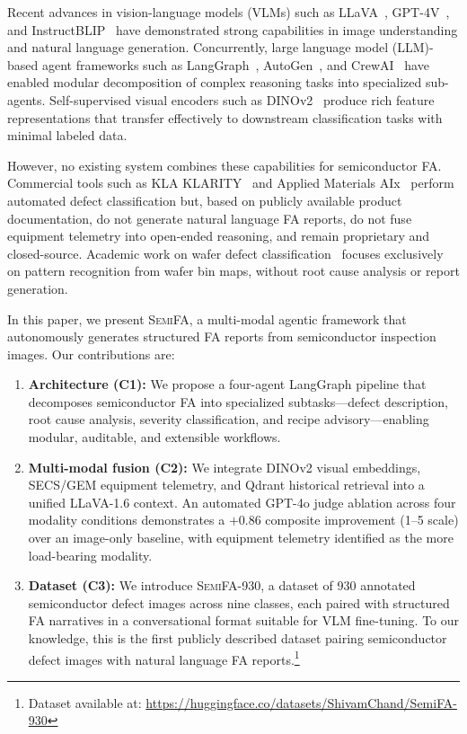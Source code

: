 \documentclass[conference]{IEEEtran}
\newcommand{\semifa}{\textsc{SemiFA}}
\newcommand{\semidataset}{\textsc{SemiFA-930}}
\begin{document}
Recent advances in vision-language models (VLMs) such as LLaVA~\cite{liu2024visual}, GPT-4V~\cite{openai2023gpt4v}, and InstructBLIP~\cite{dai2023instructblip} have demonstrated strong capabilities in image understanding and natural language generation.
Concurrently, large language model (LLM)-based agent frameworks such as LangGraph~\cite{langgraph2024}, AutoGen~\cite{wu2023autogen}, and CrewAI~\cite{crewai2024} have enabled modular decomposition of complex reasoning tasks into specialized sub-agents.
Self-supervised visual encoders such as DINOv2~\cite{oquab2024dinov2} produce rich feature representations that transfer effectively to downstream classification tasks with minimal labeled data.

However, no existing system combines these capabilities for semiconductor FA.
Commercial tools such as KLA KLARITY~\cite{kla2023klarity} and Applied Materials AIx~\cite{amat2023actionable} perform automated defect classification but, based on publicly available product documentation, do not generate natural language FA reports, do not fuse equipment telemetry into open-ended reasoning, and remain proprietary and closed-source.
Academic work on wafer defect classification~\cite{wu2015wafer,saqlain2020voting,shim2020active} focuses exclusively on pattern recognition from wafer bin maps, without root cause analysis or report generation.

In this paper, we present \semifa{}, a multi-modal agentic framework that autonomously generates structured FA reports from semiconductor inspection images.
Our contributions are:

\begin{enumerate}[leftmargin=*]
    \item \textbf{Architecture (C1):} We propose a four-agent LangGraph pipeline that decomposes semiconductor FA into specialized subtasks---defect description, root cause analysis, severity classification, and recipe advisory---enabling modular, auditable, and extensible workflows.
    \item \textbf{Multi-modal fusion (C2):} We integrate DINOv2 visual embeddings, SECS/GEM equipment telemetry, and Qdrant historical retrieval into a unified LLaVA-1.6 context. An automated GPT-4o judge ablation across four modality conditions demonstrates a $+$0.86 composite improvement (1--5 scale) over an image-only baseline, with equipment telemetry identified as the more load-bearing modality.
    \item \textbf{Dataset (C3):} We introduce \semidataset{}, a dataset of 930 annotated semiconductor defect images across nine classes, each paired with structured FA narratives in a conversational format suitable for VLM fine-tuning. To our knowledge, this is the first publicly described dataset pairing semiconductor defect images with natural language FA reports.\footnote{Dataset available at: \url{https://huggingface.co/datasets/ShivamChand/SemiFA-930}}
\end{enumerate}
\end{document}
